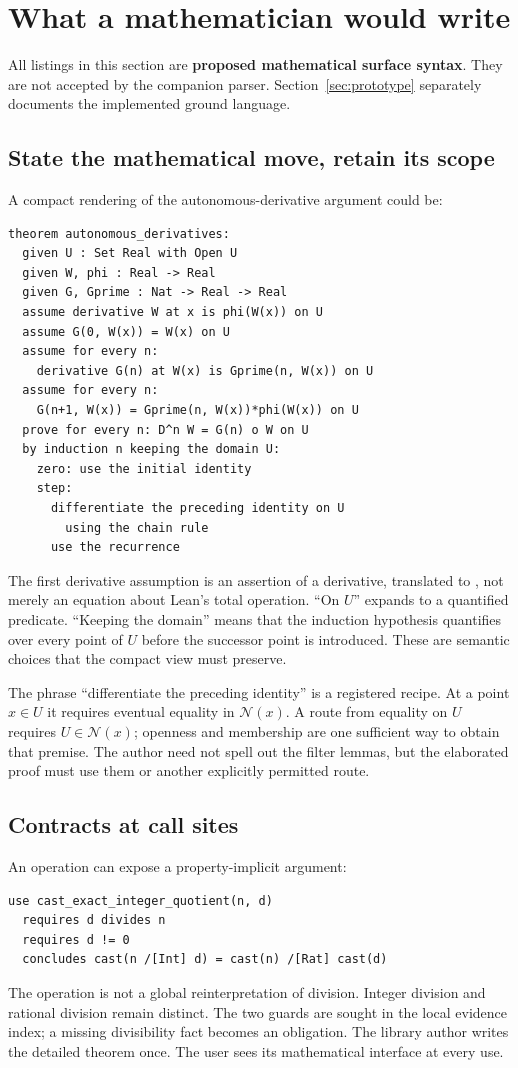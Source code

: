 \documentclass[11pt,a4paper]{article}
\newcommand{\code}[1]{\texttt{\small\detokenize{#1}}}
\theoremstyle{definition}\newtheorem{definition}[theorem]{Definition}
\theoremstyle{remark}\newtheorem{remark}[theorem]{Remark}
\begin{document}
\section{What a mathematician would write}
\label{sec:surface}
All listings in this section are \textbf{proposed mathematical surface syntax}. They are not accepted by the companion parser. Section~\ref{sec:prototype} separately documents the implemented ground language.

\subsection{State the mathematical move, retain its scope}
A compact rendering of the autonomous-derivative argument could be:
\begin{lstlisting}
theorem autonomous_derivatives:
  given U : Set Real with Open U
  given W, phi : Real -> Real
  given G, Gprime : Nat -> Real -> Real
  assume derivative W at x is phi(W(x)) on U
  assume G(0, W(x)) = W(x) on U
  assume for every n:
    derivative G(n) at W(x) is Gprime(n, W(x)) on U
  assume for every n:
    G(n+1, W(x)) = Gprime(n, W(x))*phi(W(x)) on U
  prove for every n: D^n W = G(n) o W on U
  by induction n keeping the domain U:
    zero: use the initial identity
    step:
      differentiate the preceding identity on U
        using the chain rule
      use the recurrence
\end{lstlisting}
The first derivative assumption is an assertion of a derivative, translated to \code{HasDerivAt}, not merely an equation about Lean's total \code{deriv} operation. ``On $U$'' expands to a quantified predicate. ``Keeping the domain'' means that the induction hypothesis quantifies over every point of $U$ before the successor point is introduced. These are semantic choices that the compact view must preserve.

The phrase ``differentiate the preceding identity'' is a registered recipe. At a point $x\in U$ it requires eventual equality in $\mathcal N(x)$. A route from equality on $U$ requires $U\in\mathcal N(x)$; openness and membership are one sufficient way to obtain that premise. The author need not spell out the filter lemmas, but the elaborated proof must use them or another explicitly permitted route.

\subsection{Contracts at call sites}
An operation can expose a property-implicit argument:
\begin{lstlisting}
use cast_exact_integer_quotient(n, d)
  requires d divides n
  requires d != 0
  concludes cast(n /[Int] d) = cast(n) /[Rat] cast(d)
\end{lstlisting}
The operation is not a global reinterpretation of division. Integer division and rational division remain distinct. The two guards are sought in the local evidence index; a missing divisibility fact becomes an obligation. The library author writes the detailed theorem once. The user sees its mathematical interface at every use.
\end{document}
